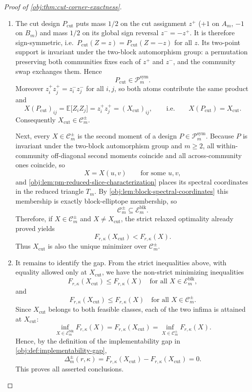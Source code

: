 \documentclass[11pt]{article}
\begin{document}
\begin{proof}[Proof of \cref{obj:thm:cut-corner-exactness}]
\begin{enumerate}
\item
The cut design \(P_{\mathrm{cut}}\) puts mass \(1/2\) on the cut assignment \(z^+\) (\(+1\) on \(A_m\), \(-1\) on \(B_m\)) and mass \(1/2\) on its global sign reversal \(z^-=-z^+\).  It is therefore sign-symmetric, i.e.\ \(P_{\mathrm{cut}}(Z=z)=P_{\mathrm{cut}}(Z=-z)\) for all \(z\).  Its two-point support is invariant under the two-block automorphism group: a permutation preserving both communities fixes each of \(z^+\) and \(z^-\), and the community swap exchanges them.  Hence
\[
P_{\mathrm{cut}}\in\mathcal P_m^{\mathrm{sym}} .
\]
Moreover \(z^+_iz^+_j=z^-_iz^-_j\) for all \(i,j\), so both atoms contribute the same product and
\[
X(P_{\mathrm{cut}})_{ij}
=\mathbb E\bigl[Z_iZ_j\bigr]
=z^+_iz^+_j
=(X_{\mathrm{cut}})_{ij},
\qquad\text{i.e.}\qquad
X(P_{\mathrm{cut}})=X_{\mathrm{cut}} .
\]
Consequently \(X_{\mathrm{cut}}\in\mathcal C_m^{\pm}\).

Next, every \(X\in\mathcal C_m^{\pm}\) is the second moment of a design \(P\in\mathcal P_m^{\mathrm{sym}}\).  Because \(P\) is invariant under the two-block automorphism group and \(m\ge2\), all within-community off-diagonal second moments coincide and all across-community ones coincide, so
\[
X=X(u,v)
\qquad\text{for some }u,v ,
\]
and \cref{obj:lem:pm-reduced-slice-characterization} places its spectral coordinates in the reduced triangle \(T_m\).  By \cref{obj:lem:block-spectral-coordinates} this membership is exactly block-elliptope membership, so
\[
\mathcal C_m^{\pm}\subseteq \mathcal E_m^{\mathrm{blk}}.
\]
Therefore, if \(X\in\mathcal C_m^{\pm}\) and \(X\ne X_{\mathrm{cut}}\), the strict relaxed optimality already proved yields
\[
F_{r,\kappa}(X_{\mathrm{cut}})<F_{r,\kappa}(X).
\]
Thus \(X_{\mathrm{cut}}\) is also the unique minimizer over \(\mathcal C_m^{\pm}\).

\item
It remains to identify the gap. From the strict inequalities above, with equality allowed only at
\(X_{\mathrm{cut}}\), we have the non-strict minimizing inequalities
\[
F_{r,\kappa}(X_{\mathrm{cut}})\le F_{r,\kappa}(X)
\quad\text{for all }X\in\mathcal E_m^{\mathrm{blk}},
\]
and
\[
F_{r,\kappa}(X_{\mathrm{cut}})\le F_{r,\kappa}(X)
\quad\text{for all }X\in\mathcal C_m^{\pm}.
\]
Since \(X_{\mathrm{cut}}\) belongs to both feasible classes, each of the two infima is attained at \(X_{\mathrm{cut}}\):
\[
\inf_{X\in\mathcal E_m^{\mathrm{blk}}}F_{r,\kappa}(X)
=F_{r,\kappa}(X_{\mathrm{cut}})
=\inf_{X\in\mathcal C_m^{\pm}}F_{r,\kappa}(X).
\]
Hence, by the definition of the implementability gap in \cref{obj:def:implementability-gap},
\[
\Delta_m^{\pm}(r,\kappa)
=
F_{r,\kappa}(X_{\mathrm{cut}})
-
F_{r,\kappa}(X_{\mathrm{cut}})
=0.
\]
This proves all asserted conclusions.
\end{enumerate}
\end{proof}
\end{document}

